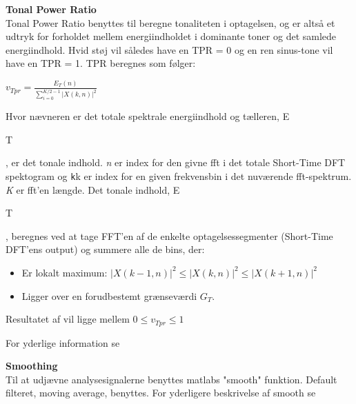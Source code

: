 \textbf{Tonal Power Ratio} \\
Tonal Power Ratio benyttes til beregne tonaliteten i optagelsen, og er altså et udtryk for forholdet mellem energiindholdet i dominante toner og det samlede energiindhold. Hvid støj vil således have en TPR = 0 og en ren sinus-tone vil have en TPR = 1. TPR beregnes som følger: 
\begin{center}
${ v }_{ Tpr }=\frac { { E }_{ T }(n) }{ \sum _{ i=0 }^{ K/2-1 }{ { \left| X(k,n) \right|  }^{ 2 } }  } $
\end{center}

Hvor nævneren er det totale spektrale energiindhold og tælleren, E\begin{tiny}T\end{tiny}, er det tonale indhold. 
\textit{n} er index for den givne fft i det totale Short-Time DFT spektogram og \verb+k+k er index for en given frekvensbin i det nuværende fft-spektrum. \textit{K} er fft'en længde.
Det tonale indhold, E\begin{tiny}T\end{tiny}, beregnes ved at tage FFT'en af de enkelte optagelsessegmenter (Short-Time DFT'ens output) og summere alle de bins, der:
\begin{itemize}
	\item Er lokalt maximum: ${ \left| X(k-1,n) \right|  }^{ 2 }\le { \left| X(k,n) \right|  }^{ 2 }\le { \left| X(k+1,n) \right|  }^{ 2 }$
	\item Ligger over en forudbestemt grænseværdi ${ G }_{ T }$.
\end{itemize} 	

Resultatet af vil ligge mellem $0\le { v }_{ Tpr }\le 1$

For yderlige information se \citep[pp. 56-57]{TPR_calc}

\textbf{Smoothing} \\
Til at udjævne analysesignalerne benyttes matlabs "smooth" funktion. Default filteret, moving average, benyttes. For yderligere beskrivelse af smooth se \citep{website:smooth}

